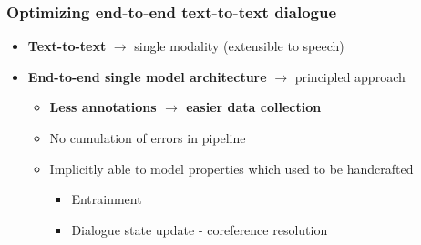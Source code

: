 \documentclass[10pt, compress,british,xcolor={svgnames,dvipsnames,x11names},trans]{beamer}
\begin{document}
\begin{frame}\frametitle{Optimizing end-to-end text-to-text dialogue}
    \begin{itemize}
        \item {\bf Text-to-text} $\longrightarrow$ single modality (extensible to speech)
        \item {\bf End-to-end single model architecture} $\longrightarrow$ principled approach
            \begin{itemize}
                \item {\bf Less annotations $\longrightarrow$ easier data collection}
                \item No cumulation of errors in pipeline
                \item Implicitly able to model properties which used to be handcrafted 
                \begin{itemize}
                    \item Entrainment
                    \item Dialogue state update - coreference resolution
                \end{itemize}
            \end{itemize}
    \end{itemize}
\end{frame}
\end{document}
